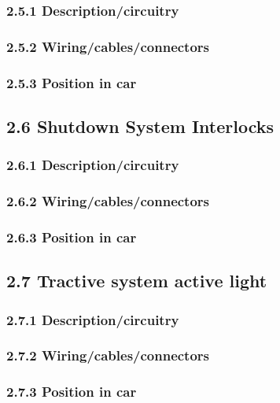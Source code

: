 \documentclass{article}
\begin{document}
\subsubsection*{2.5.1 Description/circuitry}

\subsubsection*{2.5.2 Wiring/cables/connectors}

\subsubsection*{2.5.3 Position in car}

\subsection*{2.6 Shutdown System Interlocks}

\subsubsection*{2.6.1 Description/circuitry}

\subsubsection*{2.6.2 Wiring/cables/connectors}

\subsubsection*{2.6.3 Position in car}

\subsection*{2.7 Tractive system active light}

\subsubsection*{2.7.1 Description/circuitry}

\subsubsection*{2.7.2 Wiring/cables/connectors}

\subsubsection*{2.7.3 Position in car}
\end{document}
